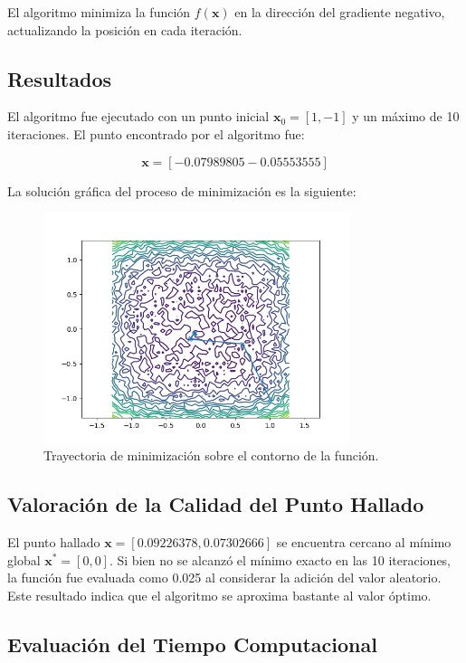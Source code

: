 \documentclass{article}
\begin{document}
	El algoritmo minimiza la función \(f(\mathbf{x})\) en la dirección del gradiente negativo, actualizando la posición en cada iteración.
	
	\subsection{Resultados}
	
	El algoritmo fue ejecutado con un punto inicial \(\mathbf{x}_0 = [1, -1]\) y un máximo de 10 iteraciones. El punto encontrado por el algoritmo fue:
	
	\[
	\mathbf{x} =  [-0.07989805 -0.05553555]
	\]
	
	La solución gráfica del proceso de minimización es la siguiente:
	
	\begin{figure}[h!]
		\centering
		\includegraphics[width=0.8\textwidth]{resultado1.png}
		\caption{Trayectoria de minimización sobre el contorno de la función.}
		\label{fig:resultado}
	\end{figure}
	
	\subsection{Valoración de la Calidad del Punto Hallado}
	
	El punto hallado \(\mathbf{x} = [0.09226378, 0.07302666]\) se encuentra cercano al mínimo global \(\mathbf{x}^* = [0, 0]\). Si bien no se alcanzó el mínimo exacto en las 10 iteraciones, la función fue evaluada como 0.025 al considerar la adición del valor aleatorio. Este resultado indica que el algoritmo se aproxima bastante al valor óptimo.
	
	\subsection{Evaluación del Tiempo Computacional}
	
\end{document}
